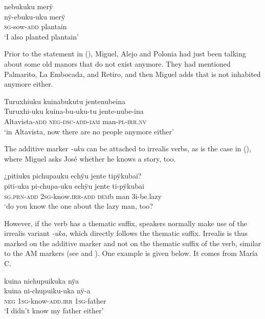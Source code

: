 \ea\label{ex:ADD-verbal}
\begingl
\glpreamble nebukuku merÿ\\
\gla nÿ-ebuku-uku merÿ\\
\textsc{sg}-sow-\textsc{add} plantain\\
\glft ‘I also planted plantain’
\endgl
\trailingcitation{[jxx-e110923l-2.063]}
\xe

Prior to the statement in (), Miguel, Alejo and Polonia had just been talking about some old manors that do not exist anymore. They had mentioned Palmarito, La Embocada, and Retiro, and then Miguel adds that  is not inhabited anymore either.

\ea\label{ex:ADD-nonverbal}
\begingl
\glpreamble Turuxhiuku kuinabukutu jentenubeina\\
\gla Turuxhi-uku kuina-bu-uku-tu jente-nube-ina\\
\glb Altavista-\textsc{add} \textsc{neg}-\textsc{dsc}-\textsc{add}-\textsc{iam} man-\textsc{pl}-\textsc{irr.nv}\\
\glft ‘in Altavista, now there are no people anymore either’
\endgl
\trailingcitation{[mty-p110906l.170]}
\xe

The additive marker \textit{-uku} can be attached to irrealis verbs, as is the case in (), where Miguel asks José whether he knows a story, too.

\ea\label{ex:know-too}
\begingl
\glpreamble ¿pitiuku pichupauku echÿu jente tipÿkubai?\\
\gla piti-uku pi-chupa-uku echÿu jente ti-pÿkubai\\
\textsc{sg.prn}-\textsc{add} 2\textsc{sg}-know.\textsc{irr}-\textsc{add} \textsc{dem}b man 3i-be.lazy\\
\glft ‘do you know the one about the lazy man, too?
\endgl
\trailingcitation{[mox-n110920l.001]}
\xe

However, if the verb has a thematic suffix, speakers normally make use of the irrealis variant \textit{-uka}, which directly follows the thematic suffix. Irrealis is thus marked on the additive marker and not on the thematic suffix of the verb, similar to the AM markers (see  and ). One example is given below. It comes from María C.

\ea\label{ex:ADD-IRR-2}
\begingl
\glpreamble kuina nichupuikuka nÿa\\
\gla kuina ni-chupuiku-uka nÿ-a\\
\glb \textsc{neg} 1\textsc{sg}-know-\textsc{add.irr} 1\textsc{sg}-father\\
\glft ‘I didn’t know my father either’
\endgl
\trailingcitation{[ump-p110815sf.148]}
\xe{} 

